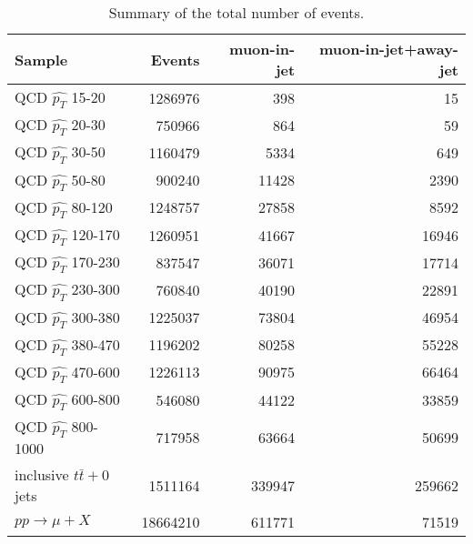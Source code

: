 \begin{table}[bth]
 \begin{center}
 \begin{tabular}{l|r|r|r}
Sample                 & Events  & muon-in-jet & muon-in-jet+away-jet \\ \hline
QCD $\hat{p_T}$ 15-20  & 1286976 &    398      &       15 \\
QCD $\hat{p_T}$ 20-30  & 750966  &   864       &      59 \\
QCD $\hat{p_T}$ 30-50  & 1160479 &   5334      &      649 \\
QCD $\hat{p_T}$ 50-80  & 900240  & 11428       &    2390 \\
QCD $\hat{p_T}$ 80-120  & 1248757 &  27858     &      8592 \\
QCD $\hat{p_T}$ 120-170  & 1260951&   41667    &      16946 \\
QCD $\hat{p_T}$ 170-230  & 837547 &  36071     &     17714 \\
QCD $\hat{p_T}$ 230-300  & 760840 &  40190     &     22891 \\
QCD $\hat{p_T}$ 300-380  & 1225037&   73804    &      46954 \\
QCD $\hat{p_T}$ 380-470  & 1196202&   80258    &      55228 \\
QCD $\hat{p_T}$ 470-600  & 1226113&   90975    &      66464 \\
QCD $\hat{p_T}$ 600-800  & 546080 &  44122     &     33859 \\
QCD $\hat{p_T}$ 800-1000  & 717958  &   63664  &        50699 \\ \hline
inclusive $t\bar{t}+0$jets& 1511164 &    339947 &       259662 \\ \hline
$pp\rightarrow \mu +X$    & 18664210 &    611771 &      71519 \\ \hline

 \end{tabular}
 \end{center}
\caption[]{Summary of the total number of events.}
\label{tab:samples}
\end{table}

